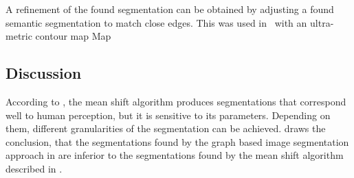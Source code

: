 A refinement of the found segmentation can be obtained by adjusting a found
semantic segmentation to match close edges. This was used
in~\cite{brox2011object} with an ultra-metric contour map
Map~\cite{arbelaez2009contours}


\subsection{Discussion}%
\label{subsec:traditional-approaches-discussion}%
According to \cite{pantofaru2005comparison}, the mean shift algorithm produces
segmentations that correspond well to human perception, but it is sensitive to
its parameters. Depending on them, different granularities of the segmentation
can be achieved. \cite{pantofaru2005comparison} draws the conclusion, that
the segmentations found by the graph based image segmentation approach
in \cite{felzenszwalb2004efficient} are inferior to the segmentations found
by the mean shift algorithm described in \cite{comaniciu2002mean}.
